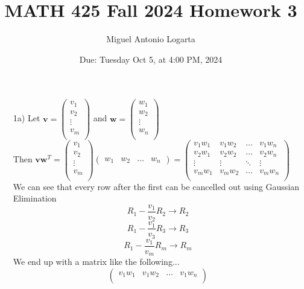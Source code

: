 \documentclass{article}
\title{MATH 425 Fall 2024 Homework 3}
\date{Due: Tuesday Oct 5, at 4:00 PM, 2024}
\author{Miguel Antonio Logarta}
\begin{document}
\maketitle  %

\begin{enumerate}
    \item[1a)] Let 
    $\textbf{v} = \begin{pmatrix}
        {v}_1 \\
        {v}_2 \\
        \vdots \\
        {v}_m \\
    \end{pmatrix}$ 
    and 
    $\textbf{w}= \begin{pmatrix}
        {w}_1 \\
        {w}_2 \\
        \vdots \\
        {w}_n \\
    \end{pmatrix}$
    \\
    Then $\textbf{v}\textbf{w}^T = 
    \begin{pmatrix}
        {v}_1 \\
        {v}_2 \\
        \vdots \\
        {v}_m \\
    \end{pmatrix}
    \begin{pmatrix}
        {w}_1 & {w}_2 & \dots & {w}_n
    \end{pmatrix} = 
    \begin{pmatrix}
        {v}_1{w}_1 & {v}_1{w}_2 & \dots & {v}_1{w}_n \\
        {v}_2{w}_1 & {v}_2{w}_2 & \dots & {v}_2{w}_n \\
        \vdots & \vdots & \ddots & \vdots \\
        {v}_m{w}_1 & {v}_m{w}_2 & \dots & {v}_m{w}_n \\
    \end{pmatrix}
    $
    We can see that every row after the first can be cancelled out using Gaussian Elimination
    $$ {R}_1 - \frac{{v}_1}{{v}_2}{R}_2 \rightarrow {R}_2$$
    $${R}_1 - \frac{{v}_1}{{v}_3}{R}_3 \rightarrow {R}_3$$
    $${R}_1 - \frac{{v}_1}{{v}_m}{R}_m \rightarrow {R}_m$$
    We end up with a matrix like the following...
    $$
    \begin{pmatrix}
        {v}_1{w}_1 & {v}_1{w}_2 & \dots & {v}_1{w}_n \\

\end{pmatrix}$$
\end{enumerate}
\end{document}
